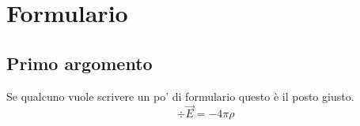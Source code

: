 \documentclass[../main.tex]{subfiles}
\begin{document}
\section{Formulario}
\setcounter{equation}{0}
\renewcommand{\theequation}{F.\arabic{equation}}

\subsection{Primo argomento}\label{pa}
Se qualcuno vuole scrivere un po' di formulario questo è il posto giusto.
\begin{equation*}
	\div \vec E=-4\pi\rho
\end{equation*}
\end{document}
